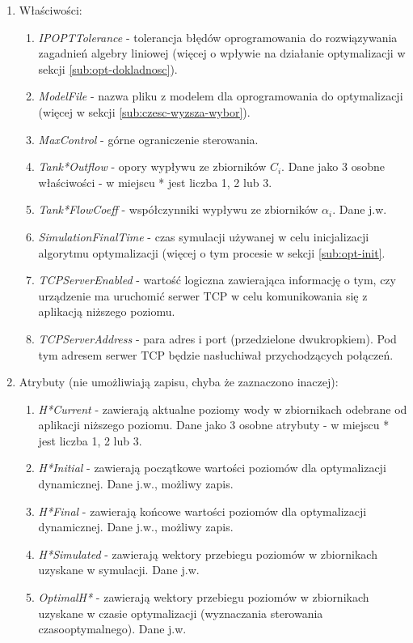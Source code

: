 \begin{enumerate}
    \item Właściwości:
    \begin{enumerate}
        \item \emph{IPOPTTolerance} - tolerancja błędów oprogramowania do rozwiązywania zagadnień algebry liniowej (więcej o wpływie na działanie optymalizacji w sekcji \ref{sub:opt-dokladnosc}).
        \item \emph{ModelFile} - nazwa pliku z modelem dla oprogramowania do optymalizacji (więcej w sekcji \ref{sub:czesc-wyzsza-wybor}).
        \item \emph{MaxControl} - górne ograniczenie sterowania.
        \item \emph{Tank*Outflow} - opory wypływu ze zbiorników $C_{i}$. Dane jako 3 osobne właściwości - w miejscu * jest liczba 1, 2 lub 3.
        \item \emph{Tank*FlowCoeff} - współczynniki wypływu ze zbiorników $\alpha_{i}$. Dane j.w.
        \item \emph{SimulationFinalTime} - czas symulacji używanej w celu inicjalizacji algorytmu optymalizacji (więcej o tym procesie w sekcji \ref{sub:opt-init}.
        \item \emph{TCPServerEnabled} - wartość logiczna zawierająca informację o tym, czy urządzenie ma uruchomić serwer TCP w celu komunikowania się z aplikacją niższego poziomu.
        \item \emph{TCPServerAddress} - para adres i port (przedzielone dwukropkiem). Pod tym adresem serwer TCP będzie nasłuchiwał przychodzących połączeń.
    \end{enumerate}
    \item Atrybuty (nie umożliwiają zapisu, chyba że zaznaczono inaczej):
    \begin{enumerate}
        \item \emph{H*Current} - zawierają aktualne poziomy wody w zbiornikach odebrane od aplikacji niższego poziomu. Dane jako 3 osobne atrybuty - w miejscu * jest liczba 1, 2 lub 3.
        \item \emph{H*Initial} - zawierają początkowe wartości poziomów dla optymalizacji dynamicznej. Dane j.w., możliwy zapis.
        \item \emph{H*Final} - zawierają końcowe wartości poziomów dla optymalizacji dynamicznej. Dane j.w., możliwy zapis.
        \item \emph{H*Simulated} - zawierają wektory przebiegu poziomów w zbiornikach uzyskane w symulacji. Dane j.w.
        \item \emph{OptimalH*} - zawierają wektory przebiegu poziomów w zbiornikach uzyskane w czasie optymalizacji (wyznaczania sterowania czasooptymalnego). Dane j.w.

\end{enumerate}
\end{enumerate}
